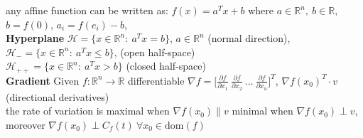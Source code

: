 \documentclass[a4paper]{article}
\begin{document}
\textsf{any affine function can be written as: } $f(x)=a^T{x}+b$ where $a\in\mathbb{R}^n, \ b \in \mathbb{R}$, $b=f(0)$, $a_i = f(e_i)-b$, \\
\textbf{Hyperplane} $\mathcal{H}=\{x\in\mathbb{R}^n: \ a^T x = b\}$, $a\in \mathbb{R}^n$ (normal direction), 
$\mathcal{H}_{-} = \{x\in\mathbb{R}^n: \ a^T x \le b \}$, (open half-space) \\
$\mathcal{H}_{++}=\{x\in\mathbb{R}^n: \ a^T x > b\}$ (closed half-space)\\
\textbf{Gradient} Given $f:\mathbb{R}^n\to\mathbb{R}$ differentiable $\nabla{f}=\bigg[
    \frac{\partial f}{\partial x_1} \ \frac{\partial f}{\partial x_2}\ ... \ \frac{\partial f}{\partial x_n}
\bigg]^T$, $\nabla{f}(x_0)^T \cdot v $ (directional derivatives)\\
\textsf{the rate of variation is maximal} when $\nabla{f}(x_0)  \parallel v $ \textsf{minimal when} $\nabla{f}(x_0) \perp v$, moreover $\nabla{f}(x_0)\perp C_f(t) \ \forall x_0 \in \text{dom}(f)$
\end{document}
